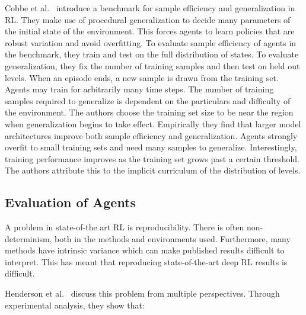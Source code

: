 Cobbe et al.~\cite{cobbe_procgen_2020} introduce a benchmark for sample efficiency and generalization in RL.
They make use of procedural generalization to decide many parameters of the initial state of the environment.
This forces agents to learn policies that are robust variation and avoid overfitting.
To evaluate sample efficiency of agents in the benchmark, they train and test on the full distribution of states.
To evaluate generalization, they fix the number of training samples and then test on held out levels.
When an episode ends, a new sample is drawn from the training set.
Agents may train for arbitrarily many time steps.
The number of training samples required to generalize is dependent on the particulars and difficulty of the environment.
The authors choose the training set size to be near the region when generalization begins to take effect.
Empirically they find that larger model architectures improve both sample efficiency and generalization.
Agents strongly overfit to small training sets and need many samples to generalize.
Interestingly, training performance improves as the training set grows past a certain threshold.
The authors attribute this to the implicit curriculum of the distribution of levels.

\subsection{Evaluation of Agents}

A problem in state-of-the art RL is reproducibility.
There is often non-determinism, both in the methods and environments used.
Furthermore, many methods have intrinsic variance which can make published results difficult to interpret.
This has meant that reproducing state-of-the-art deep RL results is difficult.

Henderson et al.~\cite{henderson_matters_2018} discuss this problem from multiple perspectives.
Through experimental analysis, they show that:

